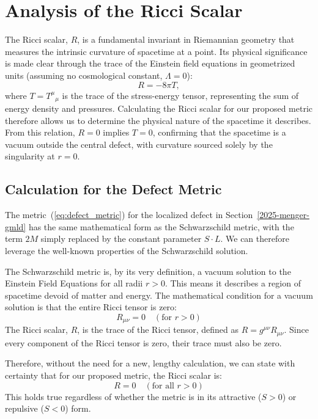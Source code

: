 \documentclass[%
  reprint,
  superscriptaddress,
  showpacs,
  showkeys,
  amsmath,amssymb,
  pra,
  longbibliography,
  floatfix,
]{revtex4-2}
\begin{document}
\section{Analysis of the Ricci Scalar}
\label{sec:ricci}

The Ricci scalar, $R$, is a fundamental invariant in Riemannian geometry that measures the intrinsic curvature of spacetime at a point. Its physical significance is made clear through the trace of the Einstein field equations in geometrized units (assuming no cosmological constant, $\Lambda=0$):
\begin{equation}
    R = -8\pi T,
\end{equation}
where $T = T^\mu{}_\mu$ is the trace of the stress-energy tensor, representing the sum of energy density and pressures. Calculating the Ricci scalar for our proposed metric therefore allows us to determine the physical nature of the spacetime it describes. From this relation, $R=0$ implies $T=0$, confirming that the spacetime is a vacuum outside the central defect, with curvature sourced solely by the singularity at $r=0$.

\subsection{Calculation for the Defect Metric}

The metric~(\ref{eq:defect_metric}) for the localized defect in Section~\ref{2025-menger-gmld}
has the   same mathematical form  as the Schwarzschild metric, with the term $2M$ simply replaced by the constant parameter $S \cdot L$. We can therefore leverage the well-known properties of the Schwarzschild solution.

The Schwarzschild metric is, by its very definition, a {vacuum solution} to the Einstein Field Equations for all radii $r > 0$. This means it describes a region of spacetime devoid of matter and energy. The mathematical condition for a vacuum solution is that the entire Ricci tensor is zero:
\begin{equation}
    R_{\mu\nu} = 0 \quad (\text{for } r > 0)
\end{equation}
The Ricci scalar, $R$, is the trace of the Ricci tensor, defined as $R = g^{\mu\nu} R_{\mu\nu}$. Since every component of the Ricci tensor is zero, their trace must also be zero.

Therefore, without the need for a new, lengthy calculation, we can state with certainty that for our proposed metric, the Ricci scalar is:
\begin{equation}
    \boxed{R = 0 \quad (\text{for all } r > 0)}
\end{equation}
This holds true regardless of whether the metric is in its attractive ($S>0$) or repulsive ($S<0$) form.
\end{document}

